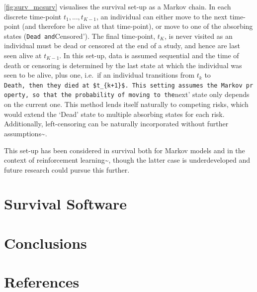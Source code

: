 \documentclass[
  letterpaper,
]{scrbook}
\theoremstyle{plain}
\theoremstyle{definition}
\theoremstyle{remark}
\begin{document}
\ref{fig:surv_mcsurv} visualises the survival set-up as a Markov chain.
In each discrete time-point \(t_1,...,t_{K-1}\), an individual can
either move to the next time-point (and therefore be alive at that
time-point), or move to one of the absorbing states
(\texttt{Dead\textquotesingle{}\ and}Censored'). The final time-point,
\(t_K\), is never visited as an individual must be dead or censored at
the end of a study, and hence are last seen alive at \(t_{K-1}\). In
this set-up, data is assumed sequential and the time of death or
censoring is determined by the last state at which the individual was
seen to be alive, plus one, i.e.~if an individual transitions from
\(t_k\) to
\texttt{Death\textquotesingle{},\ then\ they\ died\ at\ \$t\_\{k+1\}\$.\ This\ setting\ assumes\ the\ Markov\ property,\ so\ that\ the\ probability\ of\ moving\ to\ the}next'
state only depends on the current one. This method lends itself
naturally to competing risks, which would extend the `Dead' state to
multiple absorbing states for each risk. Additionally, left-censoring
can be naturally incorporated without further
assumptions\textasciitilde{}\cite{Abner2013}.

This set-up has been considered in survival both for Markov models and
in the context of reinforcement
learning\textasciitilde{}\cite{Turing2020}, though the latter case is
underdeveloped and future research could pursue this further.


\hypertarget{survival-software}{%
\chapter{Survival Software}\label{survival-software}}


\hypertarget{conclusions}{%
\chapter{Conclusions}\label{conclusions}}


\hypertarget{references}{%
\chapter*{References}\label{references}}

\end{document}
